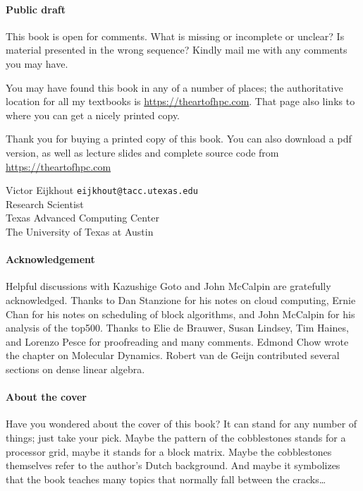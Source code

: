 \begin{notlulu}
\paragraph*{\bf Public draft}

This book is 
open for comments.
What is missing or incomplete or unclear? Is material
presented in the wrong sequence? Kindly mail me with any comments you
may have.
\end{notlulu}

\begin{download}
You may have found this book in any of a number of places;
the authoritative location for all my textbooks is
\url{https://theartofhpc.com}.
That page also links to  where you can get a nicely printed copy.
\end{download}
\begin{lulu}
Thank you for buying a printed copy of this book. 
You can also download a pdf 
version, as well as lecture slides and complete source code from
\url{https://theartofhpc.com}
\end{lulu}

\bigskip
\noindent
Victor Eijkhout {\tt eijkhout@tacc.utexas.edu}\\
Research Scientist\\
Texas Advanced Computing Center\\
The University of Texas at Austin

\paragraph*{\bf Acknowledgement}

Helpful discussions with Kazushige Goto and John McCalpin are gratefully
acknowledged. Thanks to Dan Stanzione for his notes on cloud computing,
Ernie Chan for his notes on scheduling of block algorithms, and John
McCalpin for his analysis of the top500.
Thanks to Elie de Brauwer, Susan Lindsey, Tim Haines, and Lorenzo Pesce
for proofreading and many comments.
Edmond Chow wrote the chapter on Molecular Dynamics. Robert van de Geijn
contributed several sections on dense linear algebra.

\begin{lulu}
\pagebreak
\paragraph*{\bf About the cover}

Have you wondered about the cover of this book? It can stand for any
number of things; just take your pick. Maybe the pattern of the
cobblestones stands for a processor grid, maybe it stands for a block
matrix. Maybe the cobblestones themselves refer to the author's Dutch
background. And maybe it symbolizes that the book teaches many topics
that normally fall between the cracks\ldots
\end{lulu}

